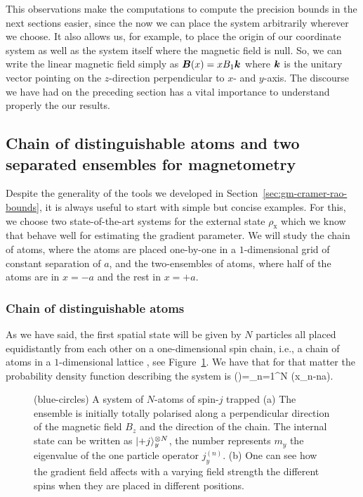 This observations make the computations to compute the precision bounds in the next sections easier, since the now we can place the system arbitrarily wherever we choose.
It also allows us, for example, to place the origin of our coordinate system as well as the system itself where the magnetic field is null.
So, we can write the linear magnetic field simply as $\boldsymbol{B}(x)= xB_1\boldsymbol{k}$ where $\boldsymbol{k}$ is the unitary vector pointing on the $z$-direction perpendicular to $x$- and $y$-axis.
The discourse we have had on the preceding section has a vital importance to understand properly the our results.


\subsection{Chain of distinguishable atoms and two separated ensembles for magnetometry}
\label{sec:gm-io-chain-and-two-ensembles}

Despite the generality of the tools we developed in Section~\ref{sec:gm-cramer-rao-bounds}, it is always useful to start with simple but concise examples.
For this, we choose two state-of-the-art systems for the external state $\rho_{\text{x}}$ which we know that behave well for estimating the gradient parameter.
We will study the chain of atoms, where the atoms are placed one-by-one in a $1$-dimensional grid of constant separation of $a$, and the two-ensembles of atoms, where half of the atoms are in $x=-a$ and the rest in $x=+a$.

\subsubsection{Chain of distinguishable atoms}

As we have said, the first spatial state will be given by $N$ particles all placed equidistantly from each other on a one-dimensional spin chain, i.e., a chain of atoms in a $1$-dimensional lattice
\cite{Altenburg2016},
see Figure~\ref{fig:ionchain-evolution}.
We have that for that matter the probability density function describing the system is
\be
  \prob()=\prod_{n=1}^N \delta(x_n-na).
\ee
\begin{figure}[htp]
  \begin{center}
    \caption[1-D chain of atoms polarized along $y$-axis under a gradient magnetic field]{(blue-circles) A system of $N$-atoms of spin-$j$ trapped
    (a) The ensemble is initially totally polarised along a
    perpendicular direction of the magnetic field $B_z$ and the direction of the chain.
    The internal state can be written as $\vert{+j}\rangle_{y}^{\otimes N}$, the number represents $m_y$ the eigenvalue of the one particle operator $j_y^{(n)}$.
    (b) One can see how the gradient field affects with a varying field strength the different spins when they are placed in different positions. }
    \label{fig:ionchain-evolution}
  \end{center}
\end{figure}

